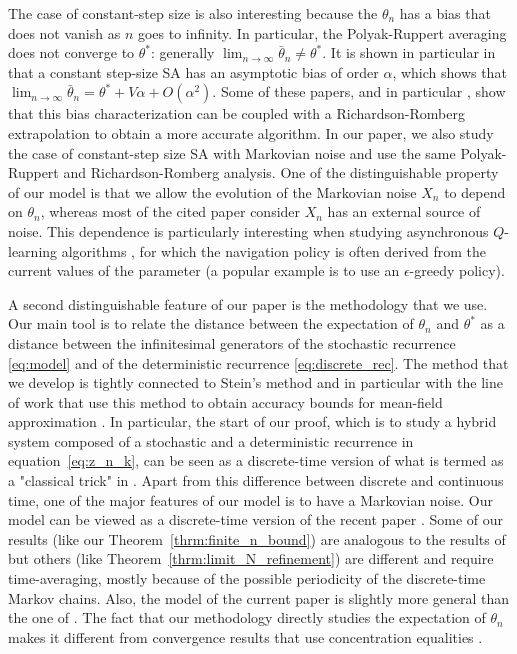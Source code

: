 \documentclass{article}
\begin{document}
The case of constant-step size is also interesting because the $\theta_n$ has a bias that does not vanish as $n$ goes to infinity. In particular, the Polyak-Ruppert averaging does not converge to $\theta^*$: generally $\lim_{n\to\infty}\bar{\theta}_n \ne \theta^*$. It is shown in particular in \cite{dieuleveut2020bridging,huo2023bias,lauand2023curse,sheshukova2024nonasymptotic,yu2021analysis,zhang2024constant} that a constant step-size SA has an asymptotic bias of order $\alpha$, which shows that $\lim_{n\to\infty}\bar{\theta}_n = \theta^* + V\alpha + O(\alpha^2)$. Some of these papers, and in particular \cite{dieuleveut2020bridging,huo2023bias}, show that this bias characterization can be coupled with a Richardson-Romberg extrapolation to obtain a more accurate algorithm.  In our paper, we also study the case of constant-step size SA with Markovian noise and use the same Polyak-Ruppert and Richardson-Romberg analysis. One of the distinguishable property of our model is that we allow the evolution of the Markovian noise $X_n$ to depend on $\theta_n$, whereas most of the cited paper consider $X_n$ has an external source of noise. This dependence is particularly interesting when studying asynchronous $Q$-learning algorithms \cite{watkins1992q,tsitsiklis1994asynchronous}, for which the navigation policy is often derived from the current values of the parameter (a popular example is to use an $\epsilon$-greedy policy). 

A second distinguishable feature of our paper is the methodology that we use. Our main tool is to relate the distance between the expectation of $\theta_n$ and $\theta^*$ as a distance between the infinitesimal generators of the stochastic recurrence \eqref{eq:model} and of the deterministic recurrence \eqref{eq:discrete_rec}. The method that we develop is tightly connected to Stein's method \cite{stein1986approximate} and in particular with the line of work that use this method to obtain accuracy bounds for mean-field approximation \cite{gast2017expected,kolokoltsovMeanFieldGames2012,ying2016rate,ying2017stein}. In particular, the start of our proof, which is to study a hybrid system composed of a stochastic and a deterministic recurrence in equation~\eqref{eq:z_n_k}, can be seen as a discrete-time version of what is termed as a "classical trick" in \cite{gast2017expected,kolokoltsovMeanFieldGames2012}. Apart from this difference between discrete and continuous time, one of the major features of our model is to have a Markovian noise. Our model can be viewed as a discrete-time version of the recent paper \cite{allmeier2023bias}. Some of our results (like our Theorem~\ref{thrm:finite_n_bound}) are analogous to the results of \cite{allmeier2023bias} but others (like Theorem~\ref{thrm:limit_N_refinement}) are different and require time-averaging, mostly because of the possible periodicity of the discrete-time Markov chains. Also, the model of the current paper is slightly more general than the one of \cite{allmeier2023bias}. The fact that our methodology directly studies the expectation of $\theta_n$ makes it different from convergence results that use concentration equalities \cite{chen2023hoeffding}.
\end{document}

